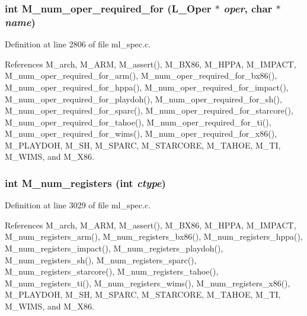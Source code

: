 \subsubsection{\setlength{\rightskip}{0pt plus 5cm}int M\_\-num\_\-oper\_\-required\_\-for (L\_\-Oper $\ast$ {\em oper}, char $\ast$ {\em name})}\label{ml__spec_8c_43c42d0b62333b91280a53d4ab1df0a5}




Definition at line 2806 of file ml\_\-spec.c.

References M\_\-arch, M\_\-ARM, M\_\-assert(), M\_\-BX86, M\_\-HPPA, M\_\-IMPACT, M\_\-num\_\-oper\_\-required\_\-for\_\-arm(), M\_\-num\_\-oper\_\-required\_\-for\_\-bx86(), M\_\-num\_\-oper\_\-required\_\-for\_\-hppa(), M\_\-num\_\-oper\_\-required\_\-for\_\-impact(), M\_\-num\_\-oper\_\-required\_\-for\_\-playdoh(), M\_\-num\_\-oper\_\-required\_\-for\_\-sh(), M\_\-num\_\-oper\_\-required\_\-for\_\-sparc(), M\_\-num\_\-oper\_\-required\_\-for\_\-starcore(), M\_\-num\_\-oper\_\-required\_\-for\_\-tahoe(), M\_\-num\_\-oper\_\-required\_\-for\_\-ti(), M\_\-num\_\-oper\_\-required\_\-for\_\-wims(), M\_\-num\_\-oper\_\-required\_\-for\_\-x86(), M\_\-PLAYDOH, M\_\-SH, M\_\-SPARC, M\_\-STARCORE, M\_\-TAHOE, M\_\-TI, M\_\-WIMS, and M\_\-X86.
\subsubsection{\setlength{\rightskip}{0pt plus 5cm}int M\_\-num\_\-registers (int {\em ctype})}\label{ml__spec_8c_12baeb9068914d3d6582343b28c33a18}




Definition at line 3029 of file ml\_\-spec.c.

References M\_\-arch, M\_\-ARM, M\_\-assert(), M\_\-BX86, M\_\-HPPA, M\_\-IMPACT, M\_\-num\_\-registers\_\-arm(), M\_\-num\_\-registers\_\-bx86(), M\_\-num\_\-registers\_\-hppa(), M\_\-num\_\-registers\_\-impact(), M\_\-num\_\-registers\_\-playdoh(), M\_\-num\_\-registers\_\-sh(), M\_\-num\_\-registers\_\-sparc(), M\_\-num\_\-registers\_\-starcore(), M\_\-num\_\-registers\_\-tahoe(), M\_\-num\_\-registers\_\-ti(), M\_\-num\_\-registers\_\-wims(), M\_\-num\_\-registers\_\-x86(), M\_\-PLAYDOH, M\_\-SH, M\_\-SPARC, M\_\-STARCORE, M\_\-TAHOE, M\_\-TI, M\_\-WIMS, and M\_\-X86.
